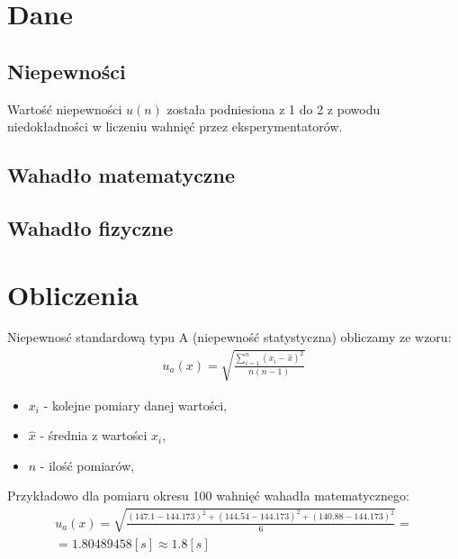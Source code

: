 \documentclass[11pt]{article}
\begin{document}
    \section{Dane}
    \subsection*{Niepewności}
    Wartość niepewności $u(n)$ została podniesiona z 1 do 2 z powodu niedokładności w liczeniu wahnięć przez eksperymentatorów.
    \subsection*{Wahadło matematyczne}
    \begin{center}
    \end{center}
    \subsection*{Wahadło fizyczne}
    \begin{center}
    \end{center}

    \section{Obliczenia}
    \noindent Niepewnosć standardową typu A (niepewność statystyczna) obliczamy ze wzoru:
    \begin{gather*}
        u_{a}(x)=\sqrt{\frac{\sum_{i=1}^n (x_i-\hat{x})^2}{n(n-1)}}
    \end{gather*}
    {\footnotesize
        \begin{itemize}
            \item[] $x_i$ - kolejne pomiary danej wartości,
            \item[] $\hat{x}$ - średnia z wartości $x_i$,
            \item[] $\hat{n}$ - ilość pomiarów,
        \end{itemize}}
    \noindent Przykładowo dla pomiaru okresu 100 wahnięć wahadła matematycznego:
    \begin{gather*}
        u_{a}(x)=\sqrt{\frac{(147.1-144.173)^2+(144.54 -144.173)^2+(140.88 -144.173)^2}{6}}=\\
        =1.80489458[s]\approx 1.8[s]
    \end{gather*}
\end{document}
